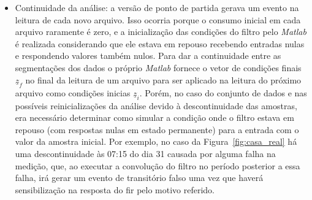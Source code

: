 \begin{itemize}
\item Continuidade da análise: a versão de ponto de partida gerava
um evento na leitura de cada novo arquivo. Isso ocorria porque o
consumo inicial em cada arquivo raramente é zero, e a inicialização
das condições do filtro pelo \emph{Matlab} é realizada considerando
que ele estava em repouso recebendo entradas nulas e respondendo
valores também nulos. Para dar a continuidade entre as segmentações
dos dados o próprio \emph{Matlab} fornece o vetor de condições finais
$\underline{z}_f$ no final da leitura de um arquivo para ser aplicado
na leitura do próximo arquivo como condições inicias
$\underline{z}_i$. Porém, no caso do conjunto de dados e nas possíveis
reinicializações da análise devido à descontinuidade das amostras, era
necessário determinar como simular a condição onde o filtro estava em
repouso (com respostas nulas em estado permanente) para a entrada com
o valor da amostra inicial. Por exemplo, no caso da
Figura~\ref{fig:casa_real} há uma descontinuidade às 07:15 do dia 31
causada por alguma falha na medição, que, ao executar a convolução do
filtro no período posterior a essa falha, irá gerar um evento de
transitório falso uma vez que haverá sensibilização na resposta do
\acs{fir} pelo motivo referido. 


\end{itemize}
